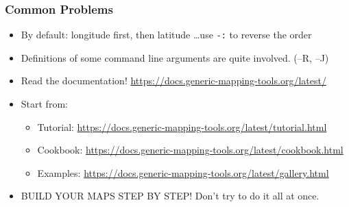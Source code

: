 \documentclass[unknownkeysallowed]{beamer}
\begin{document}
\begin{frame}
\frametitle{Common Problems}
	\begin{itemize}
		\item By default: longitude first, then latitude \dots use {\tt -:} to reverse the order
		\item Definitions of some command line arguments are quite involved. (--R, --J)
		\item Read the documentation! \url{https://docs.generic-mapping-tools.org/latest/}
		\item Start from:
			\begin{itemize}
			\item Tutorial: \url{https://docs.generic-mapping-tools.org/latest/tutorial.html}
			\item Cookbook: \url{https://docs.generic-mapping-tools.org/latest/cookbook.html}
			\item Examples: \url{https://docs.generic-mapping-tools.org/latest/gallery.html}
			\end{itemize}
		\item BUILD YOUR MAPS STEP BY STEP! Don't try to do it all at once.
	\end{itemize}
\end{frame}
\end{document}
